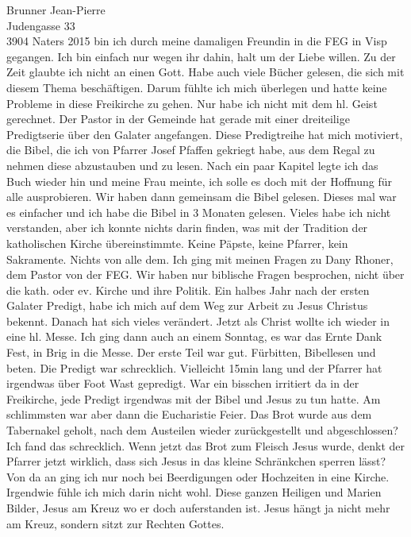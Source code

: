 \documentclass[
    12pt,
    a4paper,
    letter,
    parskip=yes,
    ]{scrlttr2}
\begin{document}
\begin{letter}{
Brunner Jean-Pierre\\
Judengasse 33\\
3904 Naters}
2015 bin ich durch meine damaligen Freundin in die FEG in Visp gegangen. Ich bin einfach nur wegen ihr dahin, halt um der Liebe willen. Zu der Zeit glaubte ich nicht an einen Gott. Habe auch viele Bücher gelesen, die sich mit diesem Thema beschäftigen. Darum fühlte ich mich überlegen und hatte keine Probleme in diese Freikirche zu gehen. Nur habe ich nicht mit dem hl. Geist gerechnet. Der Pastor in der Gemeinde hat gerade mit einer dreiteilige Predigtserie über den Galater angefangen. Diese Predigtreihe hat mich motiviert, die Bibel, die ich von Pfarrer Josef Pfaffen gekriegt habe, aus dem Regal zu nehmen diese abzustauben und zu lesen. Nach ein paar Kapitel legte ich das Buch wieder hin und meine Frau meinte, ich solle es doch mit der Hoffnung für alle ausprobieren. Wir haben dann gemeinsam die Bibel gelesen. Dieses mal war es einfacher und ich habe die Bibel in 3 Monaten gelesen. Vieles habe ich nicht verstanden, aber ich konnte nichts darin finden, was mit der Tradition der katholischen Kirche übereinstimmte. Keine Päpste, keine Pfarrer, kein Sakramente. Nichts von alle dem. Ich ging mit meinen Fragen zu Dany Rhoner, dem Pastor von der FEG. Wir haben nur biblische Fragen besprochen, nicht über die kath. oder ev. Kirche und ihre Politik. Ein halbes Jahr nach der ersten Galater Predigt, habe ich mich auf dem Weg zur Arbeit zu Jesus Christus bekennt. Danach hat sich vieles verändert. Jetzt als Christ wollte ich wieder in eine hl. Messe. Ich ging dann auch an einem Sonntag, es war das Ernte Dank Fest, in Brig in die Messe. Der erste Teil war gut. Fürbitten, Bibellesen und beten. Die Predigt war schrecklich. Vielleicht 15min lang und der Pfarrer hat irgendwas über Foot Wast gepredigt. War ein bisschen irritiert da in der Freikirche, jede Predigt irgendwas mit der Bibel und Jesus zu tun hatte. Am schlimmsten war aber dann die Eucharistie Feier. Das Brot wurde aus dem Tabernakel geholt, nach dem Austeilen wieder zurückgestellt und abgeschlossen? Ich fand das schrecklich. Wenn jetzt das Brot zum Fleisch Jesus wurde, denkt der Pfarrer jetzt wirklich, dass sich Jesus in das kleine Schränkchen sperren lässt? Von da an ging ich nur noch bei Beerdigungen oder Hochzeiten in eine Kirche. Irgendwie fühle ich mich darin nicht wohl. Diese ganzen Heiligen und Marien Bilder, Jesus am Kreuz wo er doch auferstanden ist. Jesus hängt ja nicht mehr am Kreuz, sondern sitzt zur Rechten Gottes.


\end{letter}
\end{document}
